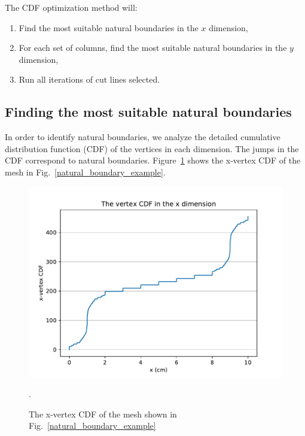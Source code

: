 The CDF optimization method will:
\begin{enumerate}
  \item Find the most suitable natural boundaries in the $x$ dimension,
  \item For each set of columns, find the most suitable natural boundaries in the $y$ dimension,
  \item Run all iterations of cut lines selected.
\end{enumerate}

\subsection{Finding the most suitable natural boundaries}

In order to identify natural boundaries, we analyze the detailed cumulative distribution function (CDF) of the vertices in each dimension. The jumps in the CDF correspond to natural boundaries. Figure~\ref{vert_cdf} shows the x-vertex CDF of the mesh in Fig.~\ref{natural_boundary_example}.
\begin{figure}[h]
\centering
\includegraphics[scale=0.75]{../figures/xvertexcdf.pdf}
\caption{The x-vertex CDF of the mesh shown in Fig.~\ref{natural_boundary_example}}.
\label{vert_cdf}
\end{figure}

